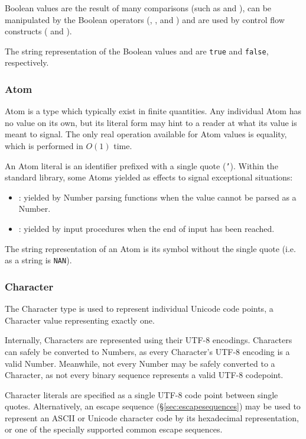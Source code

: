 Boolean values are the result of many comparisons (such as  and
), can be manipulated by the Boolean operators (, ,
and ) and are used by control flow constructs ( and
).

The string representation of the Boolean values
 and  are \texttt{true} and \texttt{false},
respectively.

\subsubsection{Atom}

Atom is a type which typically exist in finite quantities. Any individual
Atom has no value on its own, but its literal form may hint to a reader at
what its value is meant to signal. The only real operation available for
Atom values is equality, which is performed in $O(1)$ time.

An Atom literal is an identifier prefixed with a single quote (\texttt{'}).
Within the standard library, some Atoms yielded as effects to signal
exceptional situations:

\begin{itemize}
    \item {}: yielded by Number parsing functions when the value
    cannot be parsed as a Number.
    \item {}: yielded by input procedures when the end of input
    has been reached.
\end{itemize}

The string representation of an Atom is its symbol without the single quote
(i.e.  as a string is \texttt{NAN}).

\subsubsection{Character}

The Character type is used to represent individual Unicode code points,
a Character value representing exactly one.

Internally, Characters are represented using their UTF-8 encodings. Characters
can safely be converted to Numbers, as every Character's UTF-8 encoding is a valid
Number. Meanwhile, not every Number may be safely converted to a Character,
as not every binary sequence represents a valid UTF-8 codepoint.

Character literals are specified as a single UTF-8 code point between
single quotes. Alternatively, an escape sequence (\S\ref{sec:escapesequences})
may be used to represent an ASCII or Unicode character code by its hexadecimal
representation, or one of the specially supported common escape sequences.

